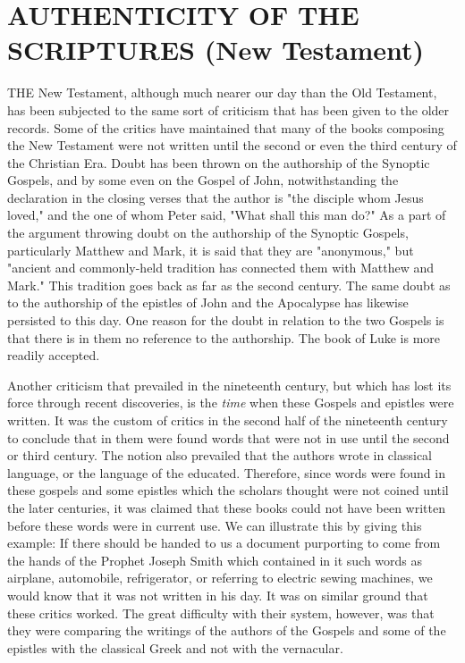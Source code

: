 \chapter{AUTHENTICITY OF THE SCRIPTURES (New Testament)}

THE New Testament, although much nearer our day than the Old Testament, has been
subjected to the same sort of criticism that has been given to the older records. Some of the
critics have maintained that many of the books composing the New Testament were not
written until the second or even the third century of the Christian Era. Doubt has been thrown
on the authorship of the Synoptic Gospels, and by some even on the Gospel of John,
notwithstanding the declaration in the closing verses that the author is "the disciple whom
Jesus loved," and the one of whom Peter said, "What shall this man do?" As a part of the
argument throwing doubt on the authorship of the Synoptic Gospels, particularly Matthew
and Mark, it is said that they are "anonymous," but "ancient and commonly-held tradition has
connected them with Matthew and Mark." This tradition goes back as far as the second
century. The same doubt as to the authorship of the epistles of John and the Apocalypse has
likewise persisted to this day. One reason for the doubt in relation to the two Gospels is that
there is in them no reference to the authorship. The book of Luke is more readily accepted.

Another criticism that prevailed in the nineteenth century, but which has lost its force
through recent discoveries, is the \textit{time} when these Gospels and epistles were written. It was
the custom of critics in the second half of the nineteenth century to conclude that in them
were found words that were not in use until the second or third century. The notion also
prevailed that the authors wrote in classical language, or the language of the educated.
Therefore, since words were found in these gospels and some epistles which the scholars
thought were not coined until the later centuries, it was claimed that these books could not
have been written before these words were in current use. We can illustrate this by giving
this example: If there should be handed to us a document purporting to come from the hands
of the Prophet Joseph Smith which contained in it such words as airplane, automobile,
refrigerator, or referring to electric sewing machines, we would know that it was not written
in his day. It was on similar ground that these critics worked. The great difficulty with their
system, however, was that they were comparing the writings of the authors of the Gospels
and some of the epistles with the classical Greek and not with the vernacular.


